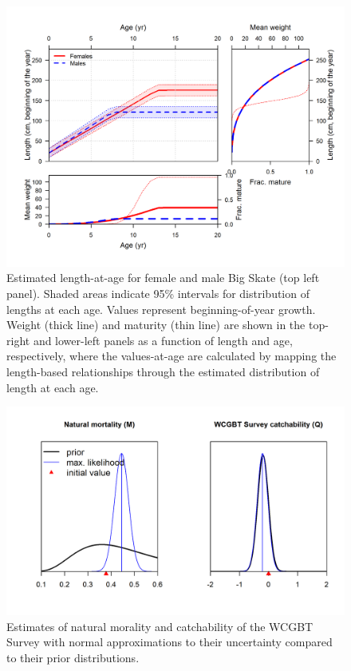 \documentclass[12pt,]{article}
\begin{document}
\begin{figure}
\centering
\includegraphics{r4ss/plots_mod1/bio3_sizeatage_plus_WT_and_MAT.png}
\caption{Estimated length-at-age for female and male Big Skate (top left
panel). Shaded areas indicate 95\% intervals for distribution of lengths
at each age. Values represent beginning-of-year growth. Weight (thick
line) and maturity (thin line) are shown in the top-right and lower-left
panels as a function of length and age, respectively, where the
values-at-age are calculated by mapping the length-based relationships
through the estimated distribution of length at each
age.\label{fig:growth}}
\end{figure}

\FloatBarrier

\begin{figure}
\centering
\includegraphics{Figures/fit_to_priors.png}
\caption{Estimates of natural morality and catchability of the WCGBT
Survey with normal approximations to their uncertainty compared to their
prior distributions. \label{fig:fit_to_priors}}
\end{figure}
\end{document}
